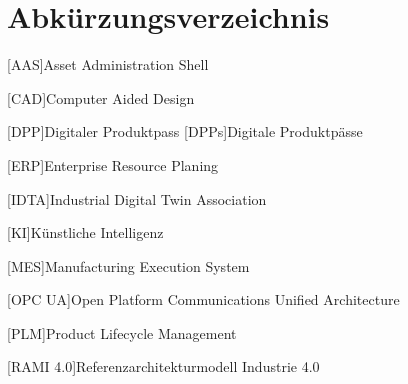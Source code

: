 \section*{Abkürzungsverzeichnis}
\begin{singlespacing}
\end{singlespacing}
\begin{acronym}

[AAS]{Asset Administration Shell}

[CAD]{Computer Aided Design}

[DPP]{Digitaler Produktpass}
[DPPs]{Digitale Produktpässe}

[ERP]{Enterprise Resource Planing}

[IDTA]{Industrial Digital Twin Association}

[KI]{Künstliche Intelligenz}

[MES]{Manufacturing Execution System}

[OPC UA]{Open Platform Communications Unified Architecture}

[PLM]{Product Lifecycle Management}

[RAMI 4.0]{Referenzarchitekturmodell Industrie 4.0}

\end{acronym}



\newpage